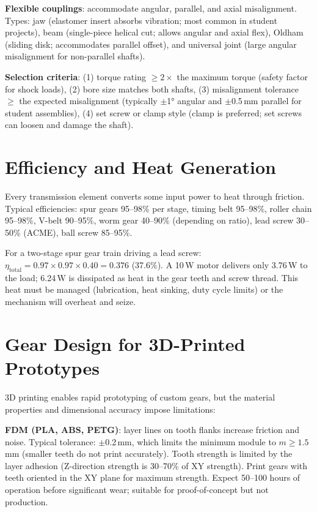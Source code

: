 \textbf{Flexible couplings}: accommodate angular, parallel, and axial misalignment. Types: jaw (elastomer insert absorbs vibration; most common in student projects), beam (single-piece helical cut; allows angular and axial flex), Oldham (sliding disk; accommodates parallel offset), and universal joint (large angular misalignment for non-parallel shafts).

\textbf{Selection criteria}: (1) torque rating $\geq 2\times$ the maximum torque (safety factor for shock loads), (2) bore size matches both shafts, (3) misalignment tolerance $\geq$ the expected misalignment (typically $\pm$\ang{1} angular and $\pm$0.5\,mm parallel for student assemblies), (4) set screw or clamp style (clamp is preferred; set screws can loosen and damage the shaft).

\section{Efficiency and Heat Generation}
Every transmission element converts some input power to heat through friction. Typical efficiencies: spur gears 95--98\% per stage, timing belt 95--98\%, roller chain 95--98\%, V-belt 90--95\%, worm gear 40--90\% (depending on ratio), lead screw 30--50\% (ACME), ball screw 85--95\%.

For a two-stage spur gear train driving a lead screw: $\eta_{\text{total}} = 0.97 \times 0.97 \times 0.40 = 0.376$ (37.6\%). A 10\,W motor delivers only 3.76\,W to the load; 6.24\,W is dissipated as heat in the gear teeth and screw thread. This heat must be managed (lubrication, heat sinking, duty cycle limits) or the mechanism will overheat and seize.
\section{Gear Design for 3D-Printed Prototypes}
3D printing enables rapid prototyping of custom gears, but the material properties and dimensional accuracy impose limitations:

\textbf{FDM (PLA, ABS, PETG)}: layer lines on tooth flanks increase friction and noise. Typical tolerance: $\pm$0.2\,mm, which limits the minimum module to $m \geq 1.5$\,mm (smaller teeth do not print accurately). Tooth strength is limited by the layer adhesion (Z-direction strength is 30--70\% of XY strength). Print gears with teeth oriented in the XY plane for maximum strength. Expect 50--100 hours of operation before significant wear; suitable for proof-of-concept but not production.

